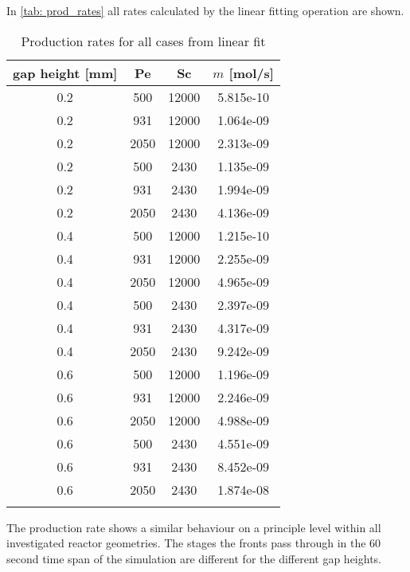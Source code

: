 \documentclass[../thesis.tex]{subfiles}
\begin{document}
In \autoref{tab: prod_rates} all rates calculated by the linear fitting operation are shown.
\begin{table} [htb]
	\centering
	\caption{Production rates for all cases from linear fit}
	\begin{tabular}{ cccc }
		\hline
		gap height [mm] & Pe & Sc & $m$ [mol/s] \\
		\hline
		0.2 & 500 & 12000 & 5.815e-10 \\
		0.2 & 931 & 12000 & 1.064e-09 \\
		0.2 & 2050 & 12000 & 2.313e-09 \\
		0.2	& 500 & 2430 & 1.135e-09 \\
		0.2	& 931 & 2430 & 1.994e-09 \\
		0.2	& 2050 & 2430 & 4.136e-09 \\
		0.4 & 500 & 12000 & 1.215e-10 \\
		0.4 & 931 & 12000 & 2.255e-09 \\
		0.4 & 2050 & 12000 & 4.965e-09 \\
		0.4	& 500 & 2430 & 2.397e-09 \\
		0.4	& 931 & 2430 & 4.317e-09 \\
		0.4	& 2050 & 2430 & 9.242e-09 \\
		0.6 & 500 & 12000 & 1.196e-09 \\
		0.6 & 931 & 12000 & 2.246e-09 \\
		0.6 & 2050 & 12000 & 4.988e-09 \\
		0.6	& 500 & 2430 & 4.551e-09 \\
		0.6	& 931 & 2430 & 8.452e-09 \\
		0.6	& 2050 & 2430 & 1.874e-08 \\
		\hline
		\label{tab: prod_rates}
	\end{tabular}
\end{table}

The production rate shows a similar behaviour on a principle level within all investigated reactor geometries. The stages the fronts pass through in the 60 second time span of the simulation are different for the different gap heights.
\end{document}

